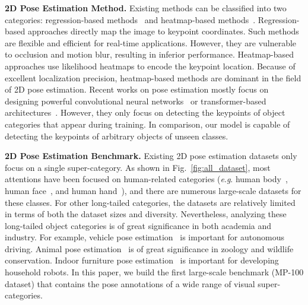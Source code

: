 \documentclass[runningheads]{llncs}
\newcommand{\eg}{\textit{e}.\textit{g}. }
\begin{document}
\textbf{2D Pose Estimation Method.}
Existing methods can be classified into two categories: regression-based methods~\cite{li2021human,nie2019single,sun2017compositional,toshev2014deeppose} and heatmap-based methods~\cite{chen2018cascaded,cheng2020higherhrnet,chu2017multi,jin2019multi,jin2020differentiable,jin2017towards,li2019crowdpose,newell2016stacked,sun2019deep,wei2016convolutional,xiao2018simple}. Regression-based approaches directly map the image to keypoint coordinates. Such methods are flexible and efficient for real-time applications. However, they are vulnerable to occlusion and motion blur, resulting in inferior performance.
Heatmap-based approaches use likelihood heatmaps to encode the keypoint location. Because of excellent localization precision, heatmap-based methods are dominant in the field of 2D pose estimation. 
Recent works on pose estimation mostly focus on designing powerful convolutional neural networks~\cite{chen2018cascaded,chu2017multi,newell2016stacked,sun2019deep,wei2016convolutional,xiao2018simple,xu2021vipnas} or transformer-based architectures~\cite{li2021tokenpose,mao2021tfpose,yang2020transpose,yuan2021hrformer,zeng2022not}. However, they only focus on detecting the keypoints of object categories that appear during training. In comparison, our model is capable of detecting the keypoints of arbitrary objects of unseen classes. 

\textbf{2D Pose Estimation Benchmark.}
Existing 2D pose estimation datasets only focus on a single super-category. As shown in Fig.~\ref{fig:all_dataset}, most attentions have been focused on human-related categories (\eg human body~\cite{andriluka2018posetrack,mpii,Jhuang2013,li2019crowdpose,lin2014microsoft,wu2017ai,zhang2019pose2seg,zhao2018understanding}, human face~\cite{aflw,300w,shen2015first,wu2018look,zafeiriou2017menpo}, and human hand~\cite{Moon_2020_ECCV_InterHand2.6M,mueller2018ganerated,mueller2017real,simon2017hand,wang2018mask,zimmermann2017learning,zimmermann2019freihand}), and there are numerous large-scale datasets for these classes. For other long-tailed categories, the datasets are relatively limited in terms of both the dataset sizes and diversity. Nevertheless, analyzing these long-tailed object categories is of great significance in both academia and industry. 
For example, vehicle pose estimation~\cite{reddy2018carfusion,song2019apollocar3d} is important for autonomous driving. 
Animal pose estimation~\cite{cao2019cross,labuguen2021macaquepose,li2020atrw,mathis2021pretraining,cub-200-2011,yu2021ap} is of great significance in zoology and wildlife conservation. 
Indoor furniture pose estimation~\cite{wu2016single} is important for developing household robots.
In this paper, we build the first large-scale benchmark (MP-100 dataset) that contains the pose annotations of a wide range of visual super-categories.
\end{document}

